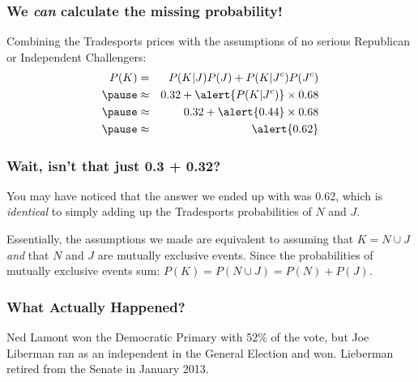 \documentclass[handout]{beamer}
\begin{document}
\begin{frame}
\frametitle{We \emph{can} calculate the missing probability!}
\normalsize
\vspace{2em}
\begin{alertblock}{Combining the Tradesports prices with the assumptions of no serious Republican or Independent Challengers:}
	\begin{eqnarray*}
		P(K)&=&  P(K|J)P(J) + P(K|J^c)P(J^c)\\
		\pause &\approx& 0.32 + \alert{P(K|J^c)} \times 0.68\\
		\pause &\approx& 0.32 + \alert{0.44} \times 0.68\\
		\pause &\approx& \alert{0.62} 
	\end{eqnarray*}
\end{alertblock}
\end{frame}
\begin{frame}
\frametitle{Wait, isn't that just 0.3 + 0.32?}
\normalsize
\vspace{2em}

You may have noticed that the answer we ended up with was 0.62, which is \emph{identical} to simply adding up the Tradesports probabilities of $N$ and $J$. 


\vspace{1em}
\alert{Essentially, the assumptions we made are equivalent to assuming that $K = N \cup J$ \emph{and} that $N$ and $J$ are mutually exclusive events. Since the probabilities of mutually exclusive events sum: $P(K) = P(N\cup J) = P(N) + P(J)$. }

\end{frame}
\begin{frame}
\frametitle{What Actually Happened?}

Ned Lamont won the Democratic Primary with 52\% of the vote, but Joe Liberman ran as an independent in the General Election and won. Lieberman retired from the Senate in January 2013.

\end{frame}
\end{document}
